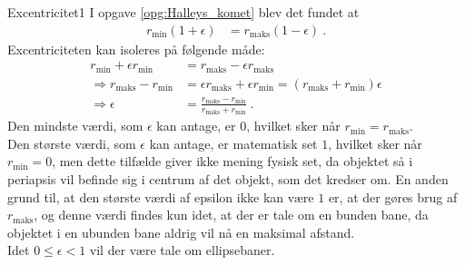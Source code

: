 \begin{opgave}{Excentricitet}{1}
\opg I opgave \ref{opg:Halleys_komet} blev det fundet at
\begin{align*}
	r_{\mathrm{min}}(1+\epsilon) &= r_{\mathrm{maks}}(1-\epsilon) \: .
\end{align*}
Excentriciteten kan isoleres på følgende måde:
\begin{align*}
	r_{\mathrm{min}}+\epsilon r_{\mathrm{min}} &= r_{\mathrm{maks}}-\epsilon r_{\mathrm{maks}} \\
	\Rightarrow r_{\mathrm{maks}}-r_{\mathrm{min}} &= \epsilon r_{\mathrm{maks}}+\epsilon r_{\mathrm{min}}
	= (r_{\mathrm{maks}}+r_{\mathrm{min}})\epsilon \\
	\Rightarrow \epsilon &= \frac{r_{\mathrm{maks}}-r_{\mathrm{min}}}{r_{\mathrm{maks}}+r_{\mathrm{min}}} \: .
\end{align*}
%
\opg Den mindste værdi, som $\epsilon$ kan antage, er $0$, hvilket sker når $r_{\mathrm{min}} = r_{\mathrm{maks}}$.\\
Den største værdi, som $\epsilon$ kan antage, er matematisk set $1$, hvilket sker når $r_{\mathrm{min}} = 0$, men dette tilfælde giver ikke mening fysisk set, da objektet så i periapsis vil befinde sig i centrum af det objekt, som det kredser om. En anden grund til, at den største værdi af epsilon ikke kan være $1$ er, at der gøres brug af $r_{\mathrm{maks}}$, og denne værdi findes kun idet, at der er tale om en bunden bane, da objektet i en ubunden bane aldrig vil nå en maksimal afstand.\\
Idet $0 \leq \epsilon < 1$ vil der være tale om ellipsebaner.
\end{opgave}
%
%
%
